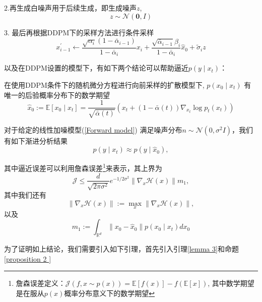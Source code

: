        2.再生成白噪声用于后续生成，即生成噪声$z$,
\begin{equation}
    {z} \sim \mathcal{N}(\mathbf{0}, {I}) 
\end{equation}
      
      
      3. 最后再根据DDPM下的采样方法进行条件采样
\begin{equation}
     {x}_{i-1}^{\prime} \leftarrow \frac{\sqrt{\alpha_i}\left(1-\bar{\alpha}_{i-1}\right)}{1-\bar{\alpha}_i} {x}_i+\frac{\sqrt{\bar{\alpha}_{i-1}} \beta_i}{1-\bar{\alpha}_i} \hat{{x}}_0+\tilde{\sigma}_i {z}
\end{equation}


以及在DDPM设置的模型下，有如下两个结论可以帮助逼近$p(y\mid x_t)$：

\begin{proposition}
\label{prop 1}
     在使用DDPM条件下的随机微分方程进行向前采样的扩散模型下, $p\left(x_0 \mid x_t\right)$ 有唯一的后验概率分布下的数学期望
$$
\hat{x}_0:=\mathbb{E}\left[x_0 \mid x_t\right]=\frac{1}{\sqrt{\bar{\alpha}(t)}}\left(x_t+(1-\bar{\alpha}(t)) \nabla_{x_t} \log p_t\left(x_t\right)\right)
$$
\end{proposition}
\begin{theorem}
\label{thm 1}
对于给定的线性加噪模型(\ref{Forward model}) 满足噪声分布${n} \sim \mathcal{N}\left(0, \sigma^2 {I}\right)$，我们有如下渐进分析结果
\begin{equation}
  p\left(y \mid x_t\right) \approx p\left(y \mid \hat{x}_0\right),
  \label{Thm 1 eq 1}
\end{equation}

其中逼近误差可以利用詹森误差\footnote{詹森误差定义：$\mathcal{J}(f,x\sim p(x)) = \mathbb{E}[f(x)]-f(\mathbb{E}[x])$, 其中数学期望是在服从$p(x)$概率分布意义下的数学期望}来表示，其上界为
\begin{equation}
\mathcal{J} \leq \frac{d}{\sqrt{2 \pi \sigma^2}} e^{-1 / 2 \sigma^2}\left\|\nabla_{x} \mathcal{H}(x)\right\| m_1,
    \label{upper bound thm 1}
\end{equation}
其中我们还有
\begin{equation}
    \left\|\nabla_{x} \mathcal{H}(x)\right\|:=\max _{x}\left\|\nabla_{x} \mathcal{H}(x)\right\|,
\end{equation}
以及
\begin{equation}
m_1:=\int_{\mathbb{R}^d}\left\|x_0-\hat{x}_0\right\| p\left(x_0 \mid x_t\right) d x_0  
\end{equation}
\end{theorem}
为了证明如上结论，我们需要引入如下引理，首先引入引理\ref{lemma 3}和命题\ref{proposition 2 }
